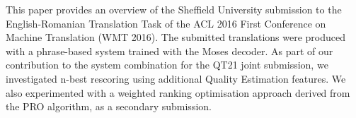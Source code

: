 This paper provides an overview of the Sheffield University submission to the English-Romanian Translation Task of the ACL 2016 First Conference on Machine Translation (WMT 2016). The submitted translations were produced with a phrase-based system trained with the Moses decoder. As part of our contribution to the system combination for the QT21 joint submission, we investigated n-best rescoring using additional Quality Estimation features. We also experimented with a weighted ranking optimisation approach derived from the PRO algorithm, as a secondary submission.
